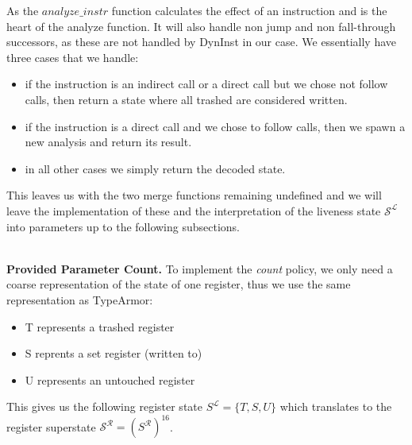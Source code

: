As the $analyze\_instr$ function calculates the effect of an instruction and is the heart of the analyze function. It will also 
handle non jump and non fall-through successors, as these are not handled by DynInst in our case. We essentially have three cases that we handle:
\begin{itemize}
\item if the instruction is an indirect call or a direct call but we chose not follow calls, then return a state where all trashed 
are considered written.
\item if the instruction is a direct call and we chose to follow calls, then we spawn a new analysis and return its result.
\item in all other cases we simply return the decoded state.
\end{itemize}

This leaves us with the two merge functions remaining undefined and we will leave the implementation of these and the interpretation of 
the liveness state $\mathcal{S}^\mathcal{L}$ into parameters up to the following subsections.

%
%

~\\
\textbf{Provided Parameter Count.}
\label{subsection:providedparamcount}
To implement the \emph{count} policy, we only need a coarse representation of the state of one register, thus we use the same representation as TypeArmor:

\begin{itemize}
\item T represents a trashed register
\item S reprents a set register (written to)
\item U represents an untouched register
\end{itemize}
This gives us the following register state $S^\mathcal{L} = \{ T, S, U \}$ which translates to the register superstate $\mathcal{S}^\mathcal{R} = (S^\mathcal{R})^{16}$.


